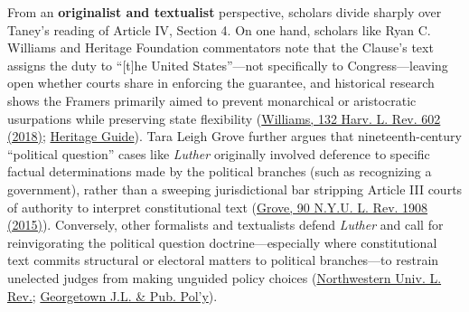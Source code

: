 \documentclass[12pt]{article}
\begin{document}
From an \textbf{originalist and textualist} perspective, scholars divide sharply over Taney's reading of Article IV, Section 4. On one hand, scholars like Ryan C. Williams and Heritage Foundation commentators note that the Clause's text assigns the duty to ``[t]he United States''---not specifically to Congress---leaving open whether courts share in enforcing the guarantee, and historical research shows the Framers primarily aimed to prevent monarchical or aristocratic usurpations while preserving state flexibility (\href{https://harvardlawreview.org/wp-content/uploads/2018/12/602-688_Online.pdf}{Williams, 132 Harv. L. Rev. 602 (2018)}; \href{https://constitution.heritage.org/essays/a4-s4/}{Heritage Guide}). Tara Leigh Grove further argues that nineteenth-century ``political question'' cases like \textit{Luther} originally involved deference to specific factual determinations made by the political branches (such as recognizing a government), rather than a sweeping jurisdictional bar stripping Article III courts of authority to interpret constitutional text (\href{https://scholarship.law.wm.edu/cgi/viewcontent.cgi?article=2834&context=facpubs}{Grove, 90 N.Y.U. L. Rev. 1908 (2015)}). Conversely, other formalists and textualists defend \textit{Luther} and call for reinvigorating the political question doctrine---especially where constitutional text commits structural or electoral matters to political branches---to restrain unelected judges from making unguided policy choices (\href{https://scholarlycommons.law.northwestern.edu/cgi/viewcontent.cgi?article=1477&context=nulr}{Northwestern Univ. L. Rev.}; \href{https://www.law.georgetown.edu/public-policy-journal/wp-content/uploads/sites/23/2022/09/GT-GLPP220051-1.pdf}{Georgetown J.L. \& Pub. Pol'y}).
\end{document}
